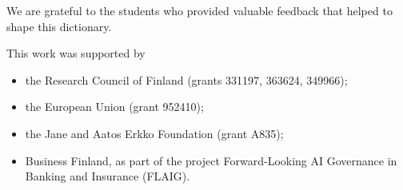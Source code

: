 \documentclass[journal,12pt,onecolumn]{article}
\newif\iffastdraft
\begin{document}
\noindent We are grateful to the students who provided valuable feedback that helped 
to shape this dictionary. %

\noindent This work was supported by
\begin{itemize} 
	\item the Research Council of Finland (grants 331197, 363624, 349966);
	\item the European Union (grant 952410);
	\item the Jane and Aatos Erkko Foundation (grant A835); 
	\item Business Finland, as part of the project Forward-Looking AI Governance in Banking and Insurance (FLAIG).
\end{itemize} 



\newpage
\tableofcontents



\newpage

\glsaddallunused


\printglossary[type=math,title={Mathematical Tools}, nonumberlist]

\newpage
\printglossary[title={Machine Learning Concepts}, nonumberlist]


\newpage
\printglossary[type=reinflearning, title={Reinforcement Learning}, nonumberlist]

\newpage
\printglossary[type=mlsystems, title={Machine Learning Systems}, nonumberlist]

\newpage
\printglossary[type=regulation, title={Machine Learning Regulation}, nonumberlist]


\iffastdraft
\else
\newpage
\cleardoublepage
{}
\printindex
\fi


\newpage
\cleardoublepage
{}
{}


\end{document}
